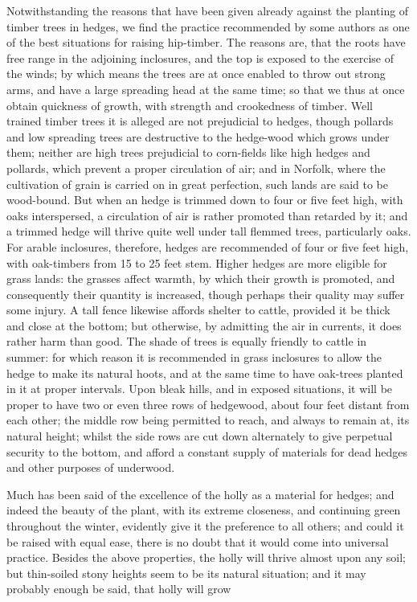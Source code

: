 \documentclass{article}
\begin{document}
Notwithstanding the reasons that have been given already against the planting of timber trees in hedges, we find the practice recommended by some authors as one of the best situations for raising hip-timber. The reasons are, that the roots have free range in the adjoining inclosures, and the top is exposed to the exercise of the winds; by which means the trees are at once enabled to throw out strong arms, and have a large spreading head at the same time; so that we thus at once obtain quickness of growth, with strength and crookedness of timber. Well trained timber trees it is alleged are not prejudicial to hedges, though pollards and low spreading trees are destructive to the hedge-wood which grows under them; neither are high trees prejudicial to corn-fields like high hedges and pollards, which prevent a proper circulation of air; and in Norfolk, where the cultivation of grain is carried on in great perfection, such lands are said to be wood-bound. But when an hedge is trimmed down to four or five feet high, with oaks interspersed, a circulation of air is rather promoted than retarded by it; and a trimmed hedge will thrive quite well under tall flemmed trees, particularly oaks. For arable inclosures, therefore, hedges are recommended of four or five feet high, with oak-timbers from 15 to 25 feet stem. Higher hedges are more eligible for grass lands: the grasses affect warmth, by which their growth is promoted, and consequently their quantity is increased, though perhaps their quality may suffer some injury. A tall fence likewise affords shelter to cattle, provided it be thick and close at the bottom; but otherwise, by admitting the air in currents, it does rather harm than good. The shade of trees is equally friendly to cattle in summer: for which reason it is recommended in grass inclosures to allow the hedge to make its natural hoots, and at the same time to have oak-trees planted in it at proper intervals. Upon bleak hills, and in exposed situations, it will be proper to have two or even three rows of hedgewood, about four feet distant from each other; the middle row being permitted to reach, and always to remain at, its natural height; whilst the side rows are cut down alternately to give perpetual security to the bottom, and afford a constant supply of materials for dead hedges and other purposes of underwood.

Much has been said of the excellence of the holly as a material for hedges; and indeed the beauty of the plant, with its extreme closeness, and continuing green throughout the winter, evidently give it the preference to all others; and could it be raised with equal ease, there is no doubt that it would come into universal practice. Besides the above properties, the holly will thrive almost upon any soil; but thin-soiled stony heights seem to be its natural situation; and it may probably enough be said, that holly will grow
\end{document}
